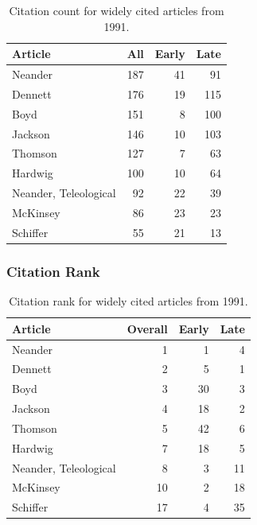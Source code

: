 \documentclass[
  10pt,
  letterpaper,
  DIV=11,
  numbers=noendperiod,
  twoside]{scrartcl}
\begin{document}
\begin{longtable}[]{@{}lrrr@{}}

\caption{\label{tbl-citation-count-1991}Citation count for widely cited
articles from 1991.}

\tabularnewline

\toprule\noalign{}
Article & All & Early & Late \\
\midrule\noalign{}
\endhead
\bottomrule\noalign{}
\endlastfoot
Neander & 187 & 41 & 91 \\
Dennett & 176 & 19 & 115 \\
Boyd & 151 & 8 & 100 \\
Jackson & 146 & 10 & 103 \\
Thomson & 127 & 7 & 63 \\
Hardwig & 100 & 10 & 64 \\
Neander, Teleological & 92 & 22 & 39 \\
McKinsey & 86 & 23 & 23 \\
Schiffer & 55 & 21 & 13 \\

\end{longtable}

\subsubsection*{Citation Rank}\label{sec-rank-1991}

\begin{longtable}[]{@{}lrrr@{}}

\caption{\label{tbl-citation-rank-1991}Citation rank for widely cited
articles from 1991.}

\tabularnewline

\toprule\noalign{}
Article & Overall & Early & Late \\
\midrule\noalign{}
\endhead
\bottomrule\noalign{}
\endlastfoot
Neander & 1 & 1 & 4 \\
Dennett & 2 & 5 & 1 \\
Boyd & 3 & 30 & 3 \\
Jackson & 4 & 18 & 2 \\
Thomson & 5 & 42 & 6 \\
Hardwig & 7 & 18 & 5 \\
Neander, Teleological & 8 & 3 & 11 \\
McKinsey & 10 & 2 & 18 \\
Schiffer & 17 & 4 & 35 \\

\end{longtable}
\end{document}
